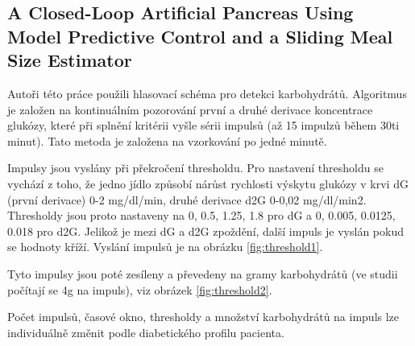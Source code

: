 \subsection{A Closed-Loop Artificial Pancreas Using Model Predictive Control and a Sliding Meal Size Estimator \citep{Analyza.Thresholds}}
\label{ch:thrashold}

Autoři této práce použili hlasovací schéma pro detekci karbohydrátů. Algoritmus je založen na kontinuálním  pozorování první a druhé derivace koncentrace glukózy, které při splnění kritérii vyšle sérii impulsů (až 15 impulzů během 30ti minut). Tato metoda je založena na vzorkování po jedné minutě.

 Impulsy jsou vyslány při překročení thresholdu. Pro nastavení thresholdu se vychází z toho, že jedno jídlo způsobí nárůst rychlosti výskytu glukózy v krvi dG (první derivace) 0-2 mg/dl/min, druhé derivace d2G 0-0,02 mg/dl/min2. Thresholdy jsou proto nastaveny na {0, 0.5, 1.25, 1.8} pro dG a {0, 0.005, 0.0125, 0.018} pro d2G. Jelikož je mezi dG a d2G zpoždění, další impuls je vyslán pokud se hodnoty kříží. Vyslání impulsů je na obrázku \ref{fig:threshold1}.
 
Tyto impulsy jsou poté zesíleny a převedeny na gramy karbohydrátů (ve studii počítají se 4g na impuls), viz obrázek \ref{fig:threshold2}.

Počet impulsů, časové okno, thresholdy a množství karbohydrátů na impuls lze individuálně změnit podle diabetického profilu pacienta.

